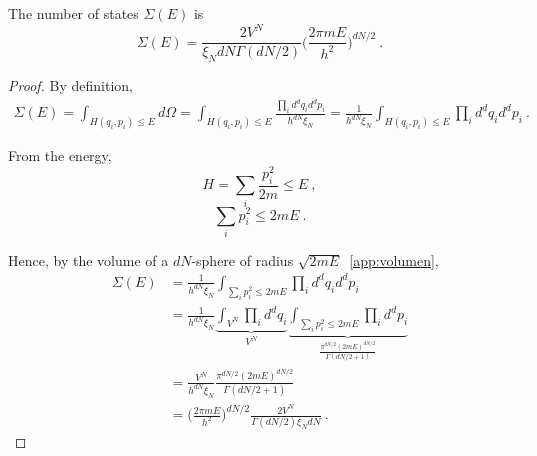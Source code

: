     The number of states $\Sigma(E)$ is 
    \begin{equation*}
        \Sigma(E) = \frac{2V^{N}}{\xi_N d N \Gamma(dN/2)} \Big ( \frac{2 \pi m E}{h^2}\Big)^{dN/2} ~.
    \end{equation*}
    \begin{proof}
        By definition, 
        \begin{equation*}
        \begin{aligned}
            \Sigma (E) = \int_{H (q_i, p_i) \leq E} d\Omega = \int_{H (q_i, p_i) \leq E} \frac{\prod_i d^d q_i d^d p_i}{h^{dN} \xi_N} = \frac{1}{h^{dN} \xi_N} \int_{H (q_i, p_i) \leq E} \prod_i d^d q_i d^d p_i ~.
        \end{aligned}
        \end{equation*}

        From the energy,
        \begin{equation*}
            H = \sum_i \frac{p^2_i}{2m} \leq E ~,
        \end{equation*}
        \begin{equation*}
            \sum_i p^2_i \leq 2mE ~.
        \end{equation*}

        Hence, by the volume of a $dN$-sphere of radius $\sqrt{2mE}$~\eqref{app:volumen},
        \begin{equation*}
        \begin{aligned}
            \Sigma (E) & = \frac{1}{h^{dN} \xi_N} \int_{\sum_i p^2_i \leq 2mE} \prod_i d^d q_i d^d p_i \\ & = \frac{1}{h^{dN} \xi_N} \underbrace{\int_{V^N} \prod_i d^d q_i}_{V^N} \underbrace{\int_{\sum_i p^2_i \leq 2mE} \prod_i d^d p_i}_{\frac{\pi^{dN/2} (2mE)^{dN/2}}{\Gamma (dN/2 + 1)}} \\ & = \frac{V^N}{h^{dN} \xi_N} \frac{\pi^{dN/2} (2mE)^{dN/2}}{\Gamma (dN/2 + 1)} \\ & = \Big (\frac{2 \pi m E}{h^2} \Big)^{dN/2} \frac{2 V^N}{\Gamma (dN/2)\xi_N d N} ~.
        \end{aligned}
        \end{equation*}
    \end{proof}

